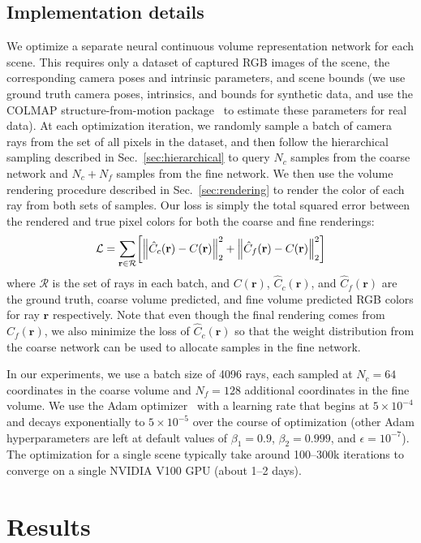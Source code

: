 \documentclass[runningheads]{llncs}
\let\originalleft\left
\let\originalright\right
\renewcommand{\left}{\mathopen{}\mathclose\bgroup\originalleft}
\renewcommand{\right}{\aftergroup\egroup\originalright}
\newcommand{\norm}[1]{\left\lVert#1\right\rVert}
\newcommand{\numsamplescoarse}{N_c}
\newcommand{\numsamplesfine}{N_f}
\newcommand{\ray}{\mathbf{r}}
\newcommand{\Ltrain}{\mathcal{L}}
\newcommand{\raybatch}{\mathcal{R}}
\newcommand{\Ccoarse}{\hat{C}_c(\ray)}
\newcommand{\Cfine}{\hat{C}_f(\ray)}
\newcommand{\Ctrue}{C(\ray)}
\begin{document}
\subsection{Implementation details}

We optimize a separate neural continuous volume representation network for each scene. This requires only a dataset of captured RGB images of the scene, the corresponding camera poses and intrinsic parameters, and scene bounds (we use ground truth camera poses, intrinsics, and bounds for synthetic data, and use the COLMAP structure-from-motion package~\cite{colmap} to estimate these parameters for real data). At each optimization iteration, we randomly sample a batch of camera rays from the set of all pixels in the dataset, and then follow the hierarchical sampling described in Sec.~\ref{sec:hierarchical} to query $\numsamplescoarse$ samples from the coarse network and $\numsamplescoarse+\numsamplesfine$ samples from the fine network. We then use the volume rendering procedure described in Sec.~\ref{sec:rendering} to render the color of each ray from both sets of samples. Our loss is simply the total squared error between the rendered and true pixel colors for both the coarse and fine renderings:
\begin{equation}
\Ltrain=\sum_{\ray\in\raybatch}\left[\norm{\Ccoarse-\Ctrue}_2^2+\norm{\Cfine-\Ctrue}_2^2\right]
\end{equation}
where $\raybatch$ is the set of rays in each batch, and $\Ctrue$, $\Ccoarse$, and $\Cfine$ are the ground truth, coarse volume predicted, and fine volume predicted RGB colors for ray $\ray$ respectively. Note that even though the final rendering comes from $\Cfine$, we also minimize the loss of $\Ccoarse$ so that the weight distribution from the coarse network can be used to allocate samples in the fine network.

In our experiments, we use a batch size of 4096 rays, each sampled at $\numsamplescoarse=64$ coordinates in the coarse volume and $\numsamplesfine=128$ additional coordinates in the fine volume. We use the Adam optimizer~\cite{KingmaB15} with a learning rate that begins at $5 \times 10^{-4}$ and decays exponentially to $5 \times 10^{-5}$ over the course of optimization (other Adam hyperparameters are left at default values of $\beta_1=0.9$, $\beta_2=0.999$, and $\epsilon=10^{-7}$). The optimization for a single scene typically take around 100--300k iterations to converge on a single NVIDIA V100 GPU (about 1--2 days).

\section{Results}
\end{document}
